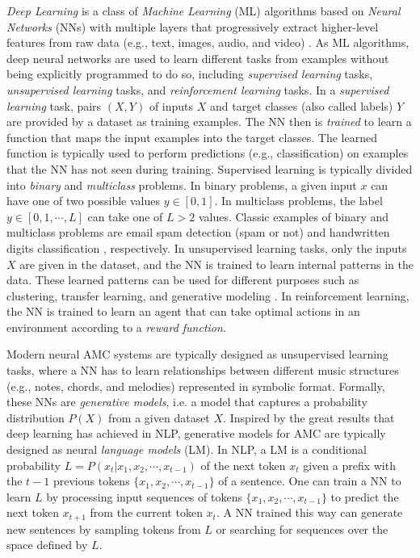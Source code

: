 \textit{Deep Learning} is a class of \textit{Machine Learning} (ML) algorithms based on \textit{Neural Networks} (NNs) with multiple layers that progressively extract higher-level features from raw data (e.g., text, images, audio, and video) \cite{goodfellow2016deep}. As ML algorithms, deep neural networks are used to learn different tasks from examples without being explicitly programmed to do so, including \textit{supervised learning} tasks, \textit{unsupervised learning} tasks, and \textit{reinforcement learning} tasks. In a \textit{supervised learning} task, pairs $(X,Y)$ of inputs $X$ and target classes (also called labels) $Y$ are provided by a dataset as training examples. The NN then is \textit{trained} to learn a function that maps the input examples into the target classes. The learned function is typically used to perform predictions (e.g., classification) on examples that the NN has not seen during training. Supervised learning is typically divided into \textit{binary} and \textit{multiclass} problems. In binary problems, a given input $x$ can have one of two possible values $y \in [0, 1]$. In multiclass problems, the label $y \in [0, 1, \cdots, L]$ can take one of $L > 2$ values. Classic examples of binary and multiclass problems are email spam detection (spam or not) and handwritten digits classification \cite{lecun1998gradient}, respectively. In unsupervised learning tasks, only the inputs $X$ are given in the dataset, and the NN is trained to learn internal patterns in the data. These learned patterns can be used for different purposes such as clustering, transfer learning, and generative modeling \cite{bengio2012unsupervised}. In reinforcement learning, the NN is trained to learn an agent that can take optimal actions in an environment according to a \textit{reward function}.

Modern neural AMC systems are typically designed as unsupervised learning tasks, where a NN has to learn relationships between different music structures (e.g., notes, chords, and melodies) represented in symbolic format. Formally, these NNs are \textit{generative models}, i.e. a model that captures a probability distribution $P(X)$ from a given dataset $X$. Inspired by the great results that deep learning has achieved in NLP, generative models for AMC are typically designed as neural \textit{language models} (LM). In NLP, a LM is a conditional probability $L = P(x_t|x_1, x_2, \cdots, x_{t-1})$ of the next token $x_t$ given a prefix with the $t-1$ previous tokens $\{x_1, x_2, \cdots, x_{t-1}\}$ of a sentence. One can train a NN to learn $L$ by processing input sequences of tokens $\{x_1, x_2, \cdots, x_{t-1}\}$ to predict the next token $x_{t+1}$ from the current token $x_t$. A NN trained this way can generate new sentences by sampling tokens from $L$ or searching for sequences over the space defined by $L$.

